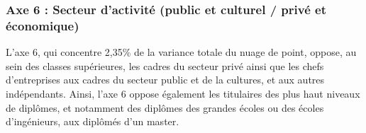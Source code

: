 \documentclass[
  12pt,
]{book}
\begin{document}
\subsubsection{Axe 6 : Secteur d'activité (public et culturel / privé et
économique)}\label{axe-6-secteur-dactivituxe9-public-et-culturel-privuxe9-et-uxe9conomique}

L'axe 6, qui concentre 2,35\% de la variance totale du nuage de point,
oppose, au sein des classes supérieures, les cadres du secteur privé
ainsi que les chefs d'entreprises aux cadres du secteur public et de la
cultures, et aux autres indépendants. Ainsi, l'axe 6 oppose également
les titulaires des plus haut niveaux de diplômes, et notamment des
diplômes des grandes écoles ou des écoles d'ingénieurs, aux diplômés
d'un master.

\begingroup\fontsize{7}{9}\selectfont
\end{document}
